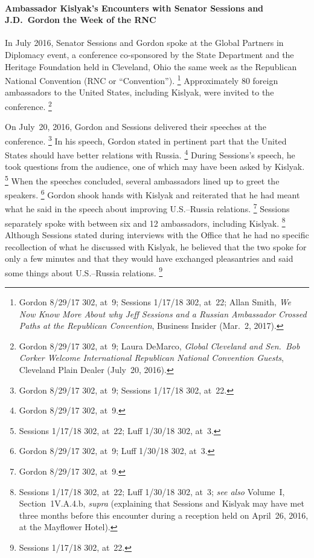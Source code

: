 \paragraph{Ambassador Kislyak's Encounters with Senator Sessions and J.D.~Gordon the Week of the RNC}

In July 2016, Senator Sessions and Gordon spoke at the Global Partners in Diplomacy event, a conference co-sponsored by the State Department and the Heritage Foundation held in Cleveland, Ohio the same week as the Republican National Convention (RNC or ``Convention'').%
\footnote{Gordon 8/29/17 302, at~9;
Sessions 1/17/18 302, at~22;
Allan Smith, \textit{We Now Know More About why Jeff Sessions and a Russian Ambassador Crossed Paths at the Republican Convention}, Business Insider (Mar.~2, 2017).}
Approximately 80 foreign ambassadors to the United States, including Kislyak, were invited to the conference.%
\footnote{Gordon 8/29/17 302, at~9;
Laura DeMarco, \textit{Global Cleveland and Sen.~Bob Corker Welcome International Republican National Convention Guests}, Cleveland Plain Dealer (July~20, 2016).
}

On July~20, 2016, Gordon and Sessions delivered their speeches at the conference.%
\footnote{Gordon 8/29/17 302, at~9;
Sessions 1/17/18 302, at~22.}
In his speech, Gordon stated in pertinent part that the United States should have better relations with Russia.%
\footnote{Gordon 8/29/17 302, at~9.}
During Sessions's speech, he took questions from the audience, one of which may have been asked by Kislyak.%
\footnote{Sessions 1/17/18 302, at~22;
Luff 1/30/18 302, at~3.}
When the speeches concluded, several ambassadors lined up to greet the speakers.%
\footnote{Gordon 8/29/17 302, at~9;
Luff 1/30/18 302, at~3.}
Gordon shook hands with Kislyak and reiterated that he had meant what he said in the speech about improving U.S.--Russia relations.%
\footnote{Gordon 8/29/17 302, at~9.}
Sessions separately spoke with between six and 12 ambassadors, including Kislyak.%
\footnote{Sessions 1/17/18 302, at~22; Luff 1/30/18 302, at~3;
\textit{see also} Volume~I, Section~1V.A.4.b, \textit{supra} (explaining that Sessions and Kislyak may have met three months before this encounter during a reception held on April~26, 2016, at the Mayflower Hotel).}
Although Sessions stated during interviews with the Office that he had no specific recollection of what he discussed with Kislyak, he believed that the two spoke for only a few minutes and that they would have exchanged pleasantries and said some things about U.S.--Russia relations.%
\footnote{Sessions 1/17/18 302, at~22.}

